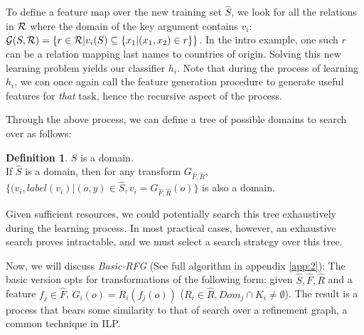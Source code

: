 \documentclass[12pt, a4paper]{article}
\theoremstyle{definition}
\newtheorem{defn}{Definition}[section]
\begin{document}
To define a feature map over the new training set $\hat{S}$, we look for all the relations in $\cal R$ where the domain of the key argument contains $v_i$:
${\cal G}(S,{\cal R}) = \left\{ r \in {\cal R} | v_i(S) \subseteq \{x_1 | (x_1,x_2) \in r\}\right\}$.  In the intro example, one such $r$ can be a relation mapping last names to countries of origin.
Solving this new learning problem yields our classifier $h_{i}$.
Note that during the process of learning $h_{i}$, we can once again call the feature generation procedure to generate useful features for \emph{that} task, hence the recursive aspect of the process.

Through the above process, we can define a tree of possible domains to search over as follows:
\begin{defn}%
$S$ is a domain.\\
If $\hat{S}$ is a domain, then for any transform $G_{\hat{F},\hat{R}}$, $\{(v_i,label(v_i)|(o,y)\in \hat{S}, v_i=G_{\hat{F},\hat{R}}(o)\}$ is also a domain.
\end{defn}
Given sufficient resources, we could potentially search this tree exhaustively during the learning process. In most practical cases, however, an exhaustive search proves intractable, and we must select a search strategy over this tree.


Now, we will discuss \emph{Basic-RFG} (See full algorithm in appendix \ref{app:2}):
The basic version opts for transformations of the following form: given $\hat{S},\hat{F},\hat{R}$ and a feature $f_{j}\in \hat{F}$, $G_{i}(o)=R_{i}(f_{j}(o))$ ($R_{i}\in \hat{R},Dom_{j}\cap K_{i}\neq \emptyset$).
The result is a process that bears some similarity to that of search over a refinement graph\citep{dvzeroski2001introduction,van1998completeness}, a common technique in ILP.
\end{document}
